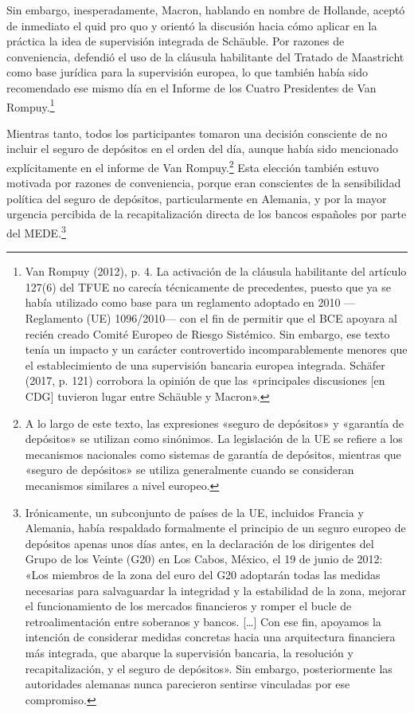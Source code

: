 \documentclass[10pt,a4paper]{article}
\begin{document}
{Sin embargo, inesperadamente, Macron, hablando en nombre de Hollande, aceptó de inmediato el quid pro quo y orientó la discusión hacia cómo aplicar en la práctica la idea de supervisión integrada de Schäuble. Por razones de conveniencia, defendió el uso de la cláusula habilitante del Tratado de Maastricht como base jurídica para la supervisión europea, lo que también había sido recomendado ese mismo día en el Informe de los Cuatro Presidentes de Van Rompuy.\footnote{
Van Rompuy (2012), p. 4. La activación de la cláusula habilitante del artículo 127(6) del TFUE no carecía técnicamente de precedentes, puesto que ya se había utilizado como base para un reglamento adoptado en 2010 —Reglamento (UE) 1096/2010— con el fin de permitir que el BCE apoyara al recién creado Comité Europeo de Riesgo Sistémico. Sin embargo, ese texto tenía un impacto y un carácter controvertido incomparablemente menores que el establecimiento de una supervisión bancaria europea integrada. Schäfer (2017, p. 121) corrobora la opinión de que las «principales discusiones [en CDG] tuvieron lugar entre Schäuble y Macron».
}

Mientras tanto, todos los participantes tomaron una decisión consciente de no incluir el seguro de depósitos en el orden del día, aunque había sido mencionado explícitamente en el informe de Van Rompuy.\footnote{
A lo largo de este texto, las expresiones «seguro de depósitos» y «garantía de depósitos» se utilizan como sinónimos. La legislación de la UE se refiere a los mecanismos nacionales como sistemas de garantía de depósitos, mientras que «seguro de depósitos» se utiliza generalmente cuando se consideran mecanismos similares a nivel europeo.
} Esta elección también estuvo motivada por razones de conveniencia, porque eran conscientes de la sensibilidad política del seguro de depósitos, particularmente en Alemania, y por la mayor urgencia percibida de la recapitalización directa de los bancos españoles por parte del MEDE.\footnote{
Irónicamente, un subconjunto de países de la UE, incluidos Francia y Alemania, había respaldado formalmente el principio de un seguro europeo de depósitos apenas unos días antes, en la declaración de los dirigentes del Grupo de los Veinte (G20) en Los Cabos, México, el 19 de junio de 2012: «Los miembros de la zona del euro del G20 adoptarán todas las medidas necesarias para salvaguardar la integridad y la estabilidad de la zona, mejorar el funcionamiento de los mercados financieros y romper el bucle de retroalimentación entre soberanos y bancos. […] Con ese fin, apoyamos la intención de considerar medidas concretas hacia una arquitectura financiera más integrada, que abarque la supervisión bancaria, la resolución y recapitalización, y el seguro de depósitos». Sin embargo, posteriormente las autoridades alemanas nunca parecieron sentirse vinculadas por ese compromiso.
}

}
\end{document}
